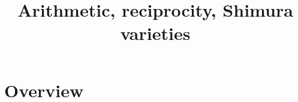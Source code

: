 

%


\title{Arithmetic, reciprocity, Shimura varieties}


\maketitle

\label{section-phantom}

\tableofcontents


\section{Overview}
\label{section-overview}







